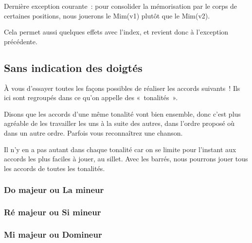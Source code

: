 \documentclass[11pt]{article}
\begin{document}
Dernière exception courante~: pour consolider la mémorisation par le corps de
certaines positions, nous jouerons le Mim(v1) plutôt que le Mim(v2).


Cela permet aussi quelques effets avec l’index, et revient donc à l’exception
précédente.

\subsection{Sans indication des doigtés}

À vous d’essayer toutes les façons possibles de réaliser les accords
suivants~! Ils ici sont regroupés dans ce qu’on appelle des «~tonalités~».

Disons que les accords d’une même tonalité vont bien ensemble, donc
c’est plus agréable de les travailler les uns à la suite des autres, dans
l’ordre proposé où dans un autre ordre. Parfois vous reconnaîtrez une chanson.

Il n’y en a pas autant dans chaque tonalité car on se limite pour l’instant aux
accords les plus faciles à jouer, au sillet. Avec les barrés, nous pourrons
jouer tous les accords de toutes les tonalités.

\subsubsection{Do majeur ou La mineur}


\subsubsection{Ré majeur ou Si mineur}


\subsubsection{Mi majeur ou Do\shrp mineur}

\end{document}
